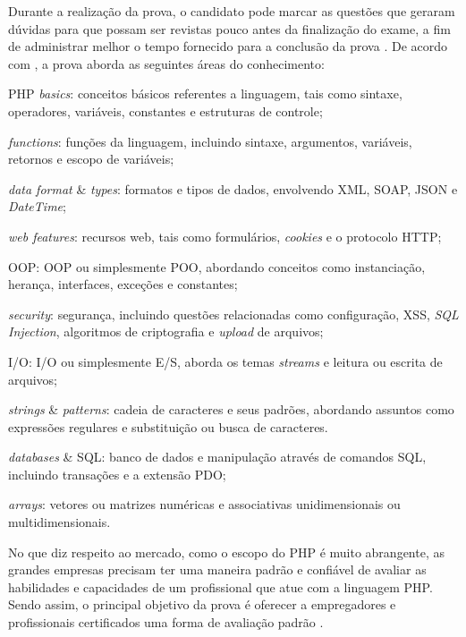 Durante a realização da prova, o candidato pode marcar as questões
que geraram dúvidas para que possam ser revistas pouco antes da finalização do
exame, a fim de administrar melhor o tempo fornecido para a conclusão da  prova
\cite{entrevistaAriZCEBrasil}. De acordo com , a 
prova aborda as seguintes áreas do conhecimento:

\begin{alineas}
    \item \acs{PHP} \textit{basics}: conceitos básicos referentes a
    linguagem, tais como sintaxe, operadores, variáveis, constantes e
    estruturas de controle;
    \item \textit{functions}: funções da linguagem, incluindo sintaxe,
    argumentos, variáveis, retornos e escopo de variáveis;
    \item \textit{data format} \& \textit{types}: formatos e tipos de
    dados, envolvendo \ac{XML}, \ac{SOAP}, \ac{JSON} e \textit{DateTime};
    \item \textit{web features}: recursos web, tais como formulários,
    \textit{cookies} e o protocolo \ac{HTTP};
    \item \acs{OOP}: \acl{OOP} ou simplesmente \ac{POO},
    abordando conceitos como instanciação, herança, interfaces, exceções e
    constantes;
    \item \textit{security}: segurança, incluindo questões relacionadas como
    configuração, \ac{XSS}, \textit{\acs{SQL} Injection},
    algoritmos de criptografia e \textit{upload} de arquivos;
    \item \acs{I/O}: \acl{I/O} ou simplesmente \ac{E/S}, aborda os
    temas \textit{streams} e leitura ou escrita de arquivos;
    \item \textit{strings} \& \textit{patterns}: cadeia de caracteres e
    seus padrões, abordando assuntos como expressões
    regulares e substituição ou busca de caracteres.
    \item \textit{databases} \& \acs{SQL}: banco de dados e
    manipulação através de comandos \ac{SQL}, incluindo transações e a
    extensão \ac{PDO};
    \item \textit{arrays}: vetores ou matrizes numéricas e
    associativas unidimensionais ou multidimensionais.
\end{alineas}

No que diz respeito ao mercado, como o escopo do \acs{PHP} é muito abrangente,
as grandes empresas precisam ter uma maneira padrão e confiável de avaliar as
habilidades e capacidades de um profissional que atue com a linguagem PHP.
Sendo assim, o principal objetivo da prova é oferecer a empregadores e profissionais
certificados uma forma de avaliação padrão \cite{zendPhp5CertificationStudyGuide}.

